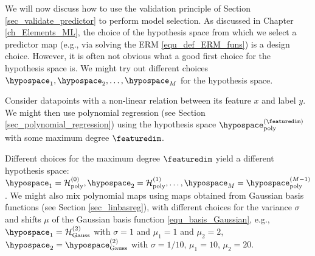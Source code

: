 \documentclass[12pt]{report}
\begin{document}
We will now discuss how to use the validation principle of 
Section \ref{sec_validate_predictor} to perform model selection. 
As discussed in Chapter \ref{ch_Elements_ML}, the choice of 
the hypothesis space from which we select a predictor map 
(e.g., via solving the ERM \eqref{equ_def_ERM_funs}) is a design choice. 
However, it is often not obvious what a good first choice 
for the hypothesis space is. We might try out different 
choices $\hypospace_{1},\hypospace_{2},\ldots,\hypospace_{M}$ 
for the hypothesis space. 

Consider datapoints with a non-linear relation between its 
feature $x$ and label $y$. We might then use polynomial 
regression (see Section \ref{sec_polynomial_regression}) 
using the hypothesis space $\hypospace_{\rm poly}^{(\featuredim)}$ 
with some maximum degree $\featuredim$. 

Different choices for the maximum degree $\featuredim$ yield 
a different hypothesis space: $\hypospace_{1} = \mathcal{H}_{\rm poly}^{(0)},\hypospace_{2} = \mathcal{H}_{\rm poly}^{(1)},\ldots,\hypospace_{M} = \hypospace_{\rm poly}^{(M-1)}$. 
We might also mix polynomial maps using maps obtained from  
Gaussian basis functions (see Section \ref{sec_linbasreg}), 
with different choices for the variance $\sigma$ and shifts $\mu$ 
of the Gaussian basis function \eqref{equ_basis_Gaussian}, 
e.g., $\hypospace_{1} = \mathcal{H}^{(2)}_{\rm Gauss}$ with $\sigma=1$ and $\mu_{1}=1$ and $\mu_{2}=2$, 
$\hypospace_{2} = \hypospace^{(2)}_{\rm Gauss}$ with $\sigma = 1/10$, $\mu_{1}=10$, $\mu_{2}= 20$.
\end{document}
